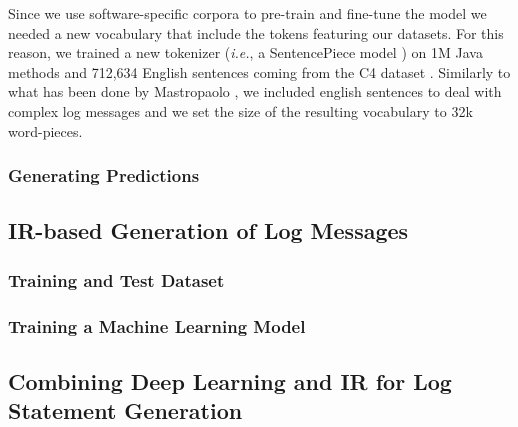 Since we use software-specific corpora to pre-train and fine-tune the model we needed a new vocabulary that include the \java tokens featuring our datasets. For this reason, we trained a new tokenizer (\emph{i.e.}, a SentencePiece model \cite{kudo2018sentencepiece}) on 1M Java methods and 712,634 English sentences coming from the C4 dataset \cite{raffel2019exploring}. Similarly to what has been done by Mastropaolo \etal \cite{mastropaolo2022using}, we included english sentences to deal with complex log messages and we set the size of the resulting vocabulary to 32k word-pieces.


\subsubsection{Generating Predictions}


\subsection{IR-based Generation of Log Messages}


\subsubsection{Training and Test Dataset}


\subsubsection{Training a Machine Learning Model}


\subsection{Combining Deep Learning and IR for Log Statement Generation}
